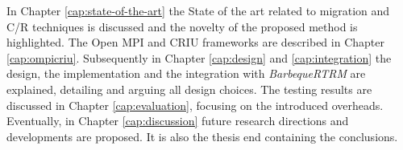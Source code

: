 In Chapter \ref{cap:state-of-the-art} the State of the art related to
migration and C/R techniques is discussed and the novelty of the
proposed method is highlighted. The Open MPI and CRIU frameworks are
described in Chapter \ref{cap:ompicriu}. Subsequently in Chapter
\ref{cap:design} and \ref{cap:integration} the design, the implementation and the integration with
\emph{BarbequeRTRM} are explained, detailing and arguing all design choices.
The testing results are discussed in Chapter \ref{cap:evaluation}, focusing on
the introduced overheads. Eventually, in Chapter \ref{cap:discussion} future
research directions and developments are proposed. It is also the thesis end containing the conclusions.   
